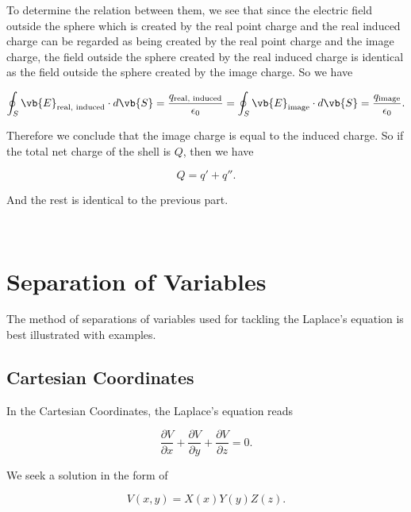 \documentclass[english,a4paper,12pt]{report}
\begin{document}
{\begin{enumerate}
    To determine the relation between them, we see that since the electric field outside the sphere which is created by the real point charge and the real induced charge can be regarded as being created by the real point charge and the image charge, the field outside the sphere created by the real induced charge is identical as the field outside the sphere created by the image charge. So we have
    
    \begin{equation}
        \oint _{S} \vb{E}_{\text{real, induced}}  \cdot d\vb{S} = \frac{q_{\text{real, induced}}}{\epsilon_0} = \oint _{S} \vb{E} _{\text{image}} \cdot d\vb{S} = \frac{q_{\text{image}}}{\epsilon_0} .
    \end{equation}
    
    Therefore we conclude that the image charge is equal to the induced charge. So if the total net charge of the shell is \(Q\), then  we have
    
    \begin{equation}
        Q = q' + q''.
    \end{equation}
    
    And the rest is identical to the previous part.
\end{enumerate}~} 


\section{Separation of Variables}

The method of separations of variables used for tackling the Laplace's equation is best illustrated with examples.

\subsection{Cartesian Coordinates}

In the Cartesian Coordinates, the Laplace's equation reads
    
\begin{equation}
    \frac{\partial V}{\partial x}  + \frac{\partial V}{\partial y}  + \frac{\partial V}{\partial z}  = 0. 
\end{equation}
            
We seek a solution in the form of 
    
\begin{equation}
    V(x,y) = X(x)Y(y)Z(z).
\end{equation}
    
\end{document}
